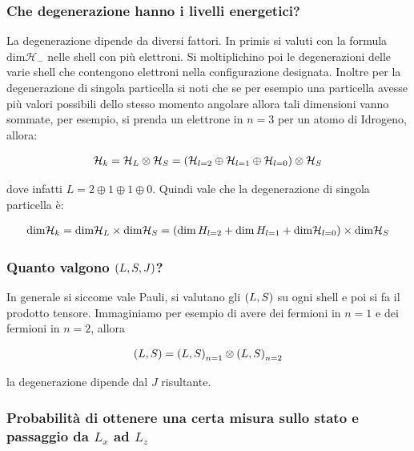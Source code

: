 \subsubsection{Che degenerazione hanno i livelli energetici?}

	La degenerazione dipende da diversi fattori. In primis si valuti con la formula $\text{dim} \mathcal{H}_-$ nelle shell con più elettroni. Si moltiplichino poi le degenerazioni delle varie shell che contengono elettroni nella configurazione designata. Inoltre per la degenerazione di singola particella si noti che se per esempio una particella avesse più valori possibili dello stesso momento angolare allora tali dimensioni vanno sommate, per esempio, si prenda un elettrone in $n = 3$ per un atomo di Idrogeno, allora:
	
\begin{align*}
	\mathcal{H}_k = \mathcal{H}_L \otimes \mathcal{H}_S = \qty(\mathcal{H}_{l = 2} \oplus \mathcal{H}_{l = 1} \oplus  \mathcal{H}_{l = 0}) \otimes \mathcal{H}_S
\end{align*}

	dove infatti $ L = 2 \oplus 1 \oplus 1 \oplus 0$. Quindi vale che la degenerazione di singola particella è:

\begin{align*}
	\text{dim} \mathcal{H}_k = \text{dim} \mathcal{H}_L \times \text{dim} \mathcal{H}_S = \qty(\dim{H}_{l = 2} + \dim{H}_{l = 1} +  \text{dim} \mathcal{H}_{l = 0}) \times \text{dim} \mathcal{H}_S
\end{align*}

\subsubsection{Quanto valgono $\qty(L, S, J)$?}

	In generale si siccome vale Pauli, si valutano gli $\qty(L, S) $ su ogni shell e poi si fa il prodotto tensore. Immaginiamo per esempio di avere dei fermioni in $n = 1$ e dei fermioni in $n = 2$, allora
	
\begin{align*}
	\qty(L, S) = \qty(L, S)_{n = 1} \otimes \qty(L, S)_{n = 2}
\end{align*}

	la degenerazione dipende dal $J$ risultante.
	
\subsubsection{Probabilità di ottenere una certa misura sullo stato e passaggio da $L_x$ ad $L_z$}

